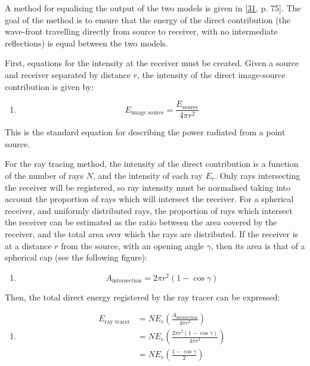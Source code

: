 \documentclass[]{scrreprt}
\providecommand{\tightlist}{%
  \setlength{\itemsep}{0pt}\setlength{\parskip}{0pt}}
\begin{document}
A method for equalising the output of the two models is given in
{[}\protect\hyperlink{ref-schroderux5fphysicallyux5f2011}{31}, p. 75{]}.
The goal of the method is to ensure that the energy of the direct
contribution (the wave-front travelling directly from source to
receiver, with no intermediate reflections) is equal between the two
models.

First, equations for the intensity at the receiver must be created.
Given a source and receiver separated by distance \(r\), the intensity
of the direct image-source contribution is given by:

\begin{enumerate}
\def\labelenumi{(\arabic{enumi})}
\setcounter{enumi}{26}
\tightlist
\item
  \[E_{\text{image source}}=\frac{E_{\text{source}}}{4\pi r^2}\]
\end{enumerate}

This is the standard equation for describing the power radiated from a
point source.

For the ray tracing method, the intensity of the direct contribution is
a function of the number of rays \(N\), and the intensity of each ray
\(E_r\). Only rays intersecting the receiver will be registered, so ray
intensity must be normalised taking into account the proportion of rays
which will intersect the receiver. For a spherical receiver, and
uniformly distributed rays, the proportion of rays which intersect the
receiver can be estimated as the ratio between the area covered by the
receiver, and the total area over which the rays are distributed. If the
receiver is at a distance \(r\) from the source, with an opening angle
\(\gamma\), then its area is that of a spherical cap (see the following
figure\text{ (\ref{fig:detected_energy})}):

\begin{enumerate}
\def\labelenumi{(\arabic{enumi})}
\setcounter{enumi}{27}
\tightlist
\item
  \[ A_{\text{intersection}} = 2\pi r^2(1-\cos\gamma) \]
\end{enumerate}

Then, the total direct energy registered by the ray tracer can be
expressed:

\begin{enumerate}
\def\labelenumi{(\arabic{enumi})}
\setcounter{enumi}{28}
\tightlist
\item
  \[
  \begin{aligned}
  E_{\text{ray tracer}} & = NE_r \left( \frac{A_{\text{intersection}}}{4\pi r^2} \right) \\
                    & = NE_r \left( \frac{2\pi r^2(1-\cos\gamma)}{4\pi r^2} \right) \\
                    & = NE_r \left( \frac{1-\cos\gamma}{2} \right)
  \end{aligned}
  \]
\end{enumerate}
\end{document}
